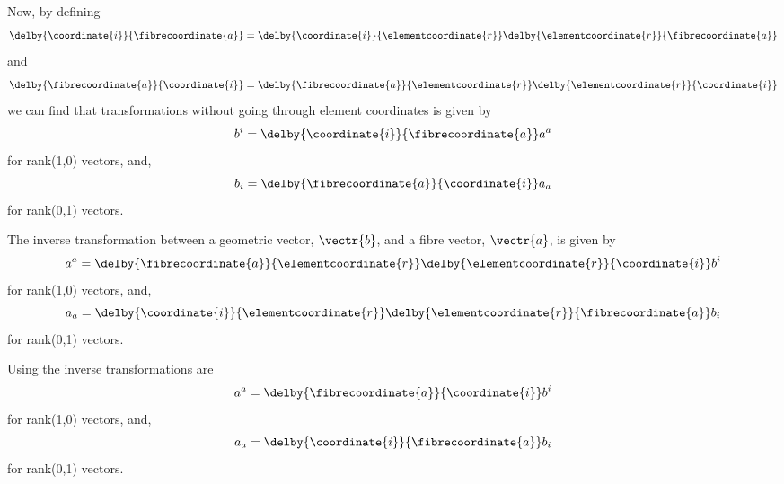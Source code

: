 Now, by defining
\begin{equation}
  \delby{\coordinate{i}}{\fibrecoordinate{a}}=\delby{\coordinate{i}}{\elementcoordinate{r}}
  \delby{\elementcoordinate{r}}{\fibrecoordinate{a}}
  \label{eqn:CoordinateToFibreTransformationViaElement}
\end{equation}
and
\begin{equation}
  \delby{\fibrecoordinate{a}}{\coordinate{i}}=\delby{\fibrecoordinate{a}}{\elementcoordinate{r}}
  \delby{\elementcoordinate{r}}{\coordinate{i}}
  \label{eqn:FibreToCoordinateTransformationViaElement}
\end{equation}
we can find that transformations without going through element coordinates is given by
\begin{equation}
  b^{i}=\delby{\coordinate{i}}{\fibrecoordinate{a}}a^{a}
  \label{eqn:Rank10FibreToCoordinateTransformation}
\end{equation}
for rank(1,0) vectors, and,
\begin{equation}
  b_{i}=\delby{\fibrecoordinate{a}}{\coordinate{i}}a_{a}
  \label{eqn:Rank01FibreToCoordinateTransformation}
\end{equation}
for rank(0,1) vectors.

The inverse transformation between a geometric vector, $\vectr{b}$, and a fibre vector, $\vectr{a}$, is given by
\begin{equation}
  a^{a}=\delby{\fibrecoordinate{a}}{\elementcoordinate{r}}\delby{\elementcoordinate{r}}{\coordinate{i}}b^{i}
  \label{eqn:Rank10CoordinateToElementToFibreTransformation}
\end{equation}
for rank(1,0) vectors, and,
\begin{equation}
  a_{a}=\delby{\coordinate{i}}{\elementcoordinate{r}}\delby{\elementcoordinate{r}}{\fibrecoordinate{a}}b_{i}
  \label{eqn:Rank01CoordinateToElementToFibreTransformation}
\end{equation}
for rank(0,1) vectors.

Using
the inverse transformations are
\begin{equation}
  a^{a}=\delby{\fibrecoordinate{a}}{\coordinate{i}}b^{i}
  \label{eqn:Rank10CoordinateToFibreTransformation}
\end{equation}
for rank(1,0) vectors, and,
\begin{equation}
  a_{a}=\delby{\coordinate{i}}{\fibrecoordinate{a}}b_{i}
  \label{eqn:Rank01CoordinateToFibreTransformation}
\end{equation}
for rank(0,1) vectors.


